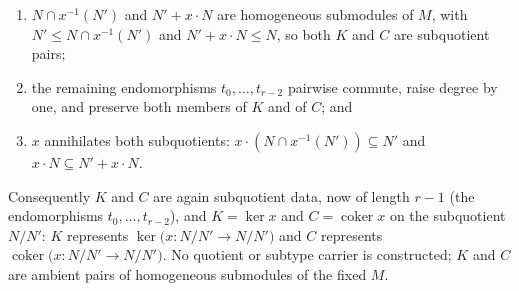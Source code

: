 \begin{lemma}
  \begin{enumerate}
    \item \(N \cap x^{-1}(N')\) and \(N' + x \cdot N\) are homogeneous submodules of
      \(M\), with \(N' \le N \cap x^{-1}(N')\) and \(N' + x \cdot N \le N\), so both
      \(K\) and \(C\) are subquotient pairs;
    \item the remaining endomorphisms \(t_0, \dots, t_{r-2}\) pairwise commute,
      raise degree by one, and preserve both members of \(K\) and of \(C\); and
    \item \(x\) annihilates both subquotients: \(x \cdot (N \cap x^{-1}(N')) \subseteq N'\)
      and \(x \cdot N \subseteq N' + x \cdot N\).
  \end{enumerate}
  Consequently \(K\) and \(C\) are again subquotient data, now of length \(r-1\)
  (the endomorphisms \(t_0, \dots, t_{r-2}\)), and \(K = \ker x\) and \(C =
  \operatorname{coker} x\) on the subquotient \(N/N'\): \(K\) represents
  \(\ker\bigl(x : N/N' \to N/N'\bigr)\) and \(C\) represents
  \(\operatorname{coker}\bigl(x : N/N' \to N/N'\bigr)\). No quotient or subtype
  carrier is constructed; \(K\) and \(C\) are ambient pairs of homogeneous
  submodules of the fixed \(M\).
\end{lemma}


